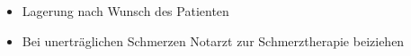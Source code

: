 \label{m:nierenkolik}%
\begin{itemize}
  \item Lagerung nach Wunsch des Patienten
  \item Bei unerträglichen Schmerzen Notarzt zur
  Schmerztherapie beiziehen
\end{itemize}
